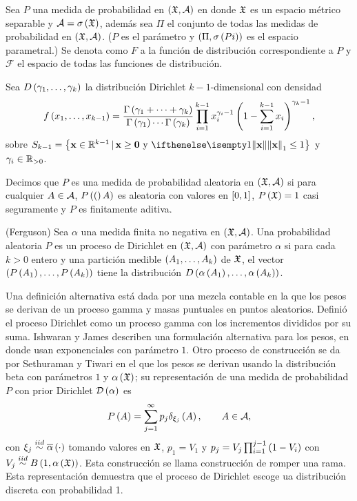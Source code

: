 Sea $P$ una medida de probabilidad en $\left( \mathfrak{X}, \mathcal{A} \right)$ en donde $\mathfrak{X}$ es un espacio métrico separable y $\mathcal{A} = \sigma\left( \mathfrak{X} \right)$, %
además sea $\Pi$ el conjunto de todas las medidas de probabilidad en $\left( \mathfrak{X}, \mathcal{A} \right)$. ($P$ es el parámetro y $\Pp{\Pi, %
\sigma\Pp{Pi}}$ es el espacio parametral.) Se denota como $F$ a la función de distribución correspondiente a $P$ y %
$\mathcal{F}$ el espacio de todas las funciones de distribución. 

Sea $D\left( \gamma_{1}, \ldots, \gamma_{k} \right)$ la distribución Dirichlet $k-1$-dimensional con densidad
\[
f\Pp{x_{1},\ldots,x_{k-1}} = \frac{\Gamma\Pp{\gamma_{1} +\cdots+ \gamma_{k}}}{\Gamma\Pp{\gamma_{1}} \cdots \Gamma\Pp{\gamma_{k}}} %
                            \prod_{i = 1}^{k-1} x_{i}^{\gamma_{i} - 1} \Pp{1 - \sum_{i = 1}^{k-1} x_{i}}^{\gamma_{k} - 1},
\]
sobre $S_{k-1} = \Set{\mathbf{x} \in \R^{k-1} \,|\, \mathbf{x} \geq \mathbf{0} \text{ y } \norm[1]{\mathbf{x}} \leq 1}$  y %
$\gamma_{i} \in \mathbb{R}_{>0}$. 

Decimos que $P$ es una medida de probabilidad aleatoria en $\left( \mathfrak{X}, \mathcal{A} \right)$ si para cualquier $A \in \mathcal{A}$, $P\left( ( \right)A)$ es %
aleatoria con valores en $\left[ 0, 1 \right]$, $P\left( \mathfrak{X} \right) = 1$ casi seguramente y $P$ es finitamente aditiva.

\begin{defi}(Ferguson) 
Sea $\alpha$ una medida finita no negativa en $\left( \mathfrak{X}, \mathcal{A} \right)$. Una probabilidad aleatoria $P$ es un proceso de Dirichlet %
en $\left( \mathfrak{X}, \mathcal{A} \right)$ con parámetro $\alpha$ si para cada $k > 0$ entero y una partición medible $\left( A_{1}, \ldots, A_{k} \right)$ %
de $\mathfrak{X}$, el vector $\left( P\left( A_{1} \right), \ldots, P\left( A_{k} \right) \right)$ tiene la distribución $D\Pp{\alpha\Pp{A_{1}}, \ldots, \alpha %
\Pp{A_{k}}}$.
\end{defi}

Una definición alternativa está dada por una mezcla contable en la que los pesos se derivan de un proceso gamma y masas %
puntuales en puntos aleatorios. Definió el proceso Dirichlet como un proceso gamma con los incrementos divididos por su %
suma. Ishwaran y James describen una formulación alternativa para los pesos, en donde usan exponenciales con parámetro %
$1$. Otro proceso de construcción se da por Sethuraman y Tiwari en el que los pesos se derivan usando la distribución %
beta con parámetros $1$ y $\alpha\left( \mathfrak{X} \right)$; su representación de una medida de probabilidad $P$ con prior Dirichlet $\D%
\Pp{\alpha}$ es
\[
P\left( A \right) = \sum_{j = 1}^{\infty} p_{j} \delta_{\xi_{j}} \left( A \right), \qquad A \in \mathcal{A},
\]
con $\xi_{j} \stackrel{iid}{\sim} \overline{\alpha}\left( \cdot \right)$ tomando valores en $\mathfrak{X}$, $p_{1} = V_{1}$ y $p_{j} = V_{j} %
\prod_{i = 1}^{j-1} \Pp{1 - V_{i}}$ con $V_{j} \stackrel{iid}{\sim} B\left( 1, \alpha\left( \mathfrak{X} \right) \right)$. Esta construcción se llama %
construcción de romper una rama. Esta representación demuestra que el proceso de Dirichlet escoge ua distribución discreta %
con probabilidad 1.

